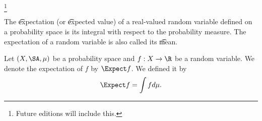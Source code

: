 

\footnote{Future editions will include this.}


The \t{expectation} (or \t{expected value}) of a real-valued random variable defined on a probability space is its integral with respect to the probability measure.
The expectation of a random variable is also called its \t{mean}.


Let $(X, \SA, \mu)$ be a probability space and $f: X \to \R$ be a random variable.
We denote the expectation of $f$ by $\Expect f$.
We defined it by
\[
  \Expect f = \int f d\mu.
\]

\blankpage
